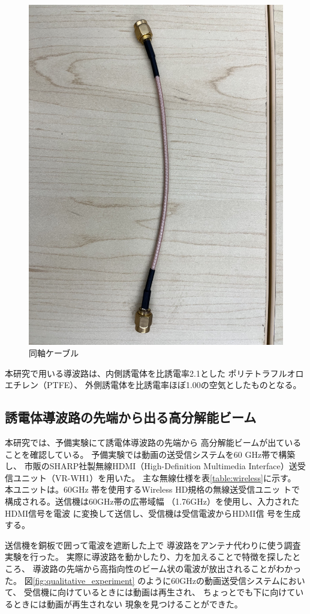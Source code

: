 \documentclass[technicalreport]{ieicej}
\begin{document}
\begin{figure}[tb]
  \begin{center}
    \includegraphics[bb=0.000000 0.000000 593.264305 791.019074, width=0.5\linewidth]{img/sma_cables.pdf}
    \caption{同軸ケーブル}
    \label{fig:sma_cables}
  \end{center}
\end{figure}

本研究で用いる導波路は、内側誘電体を比誘電率2.1とした
ポリテトラフルオロエチレン（PTFE）、
外側誘電体を比誘電率ほぼ1.00の空気としたものとなる。

\subsection{誘電体導波路の先端から出る高分解能ビーム}

本研究では、予備実験にて誘電体導波路の先端から
高分解能ビームが出ていることを確認している。
予備実験では動画の送受信システムを60 GHz帯で構築し、
市販のSHARP社製無線HDMI（High-Definition Multimedia
Interface）送受信ユニット（VR-WH1）を用いた。
主な無線仕様を表\ref{table:wireless}に示す。
本ユニットは。60GHz
帯を使用するWireless HD規格の無線送受信ユニッ
トで構成される。送信機は60GHz帯の広帯域幅
（1.76GHz）を使用し、入力されたHDMI信号を電波
に変換して送信し、受信機は受信電波からHDMI信
号を生成する。

送信機を銅板で囲って電波を遮断した上で
導波路をアンテナ代わりに使う調査実験を行った。
実際に導波路を動かしたり、力を加えることで特徴を探したところ、
導波路の先端から高指向性のビーム状の電波が放出されることがわかった。
図\ref{fig:qualitative_experiment}
のように60GHzの動画送受信システムにおいて、
受信機に向けているときには動画は再生され、
ちょっとでも下に向けているときには動画が再生されない
現象を見つけることができた。
\end{document}
